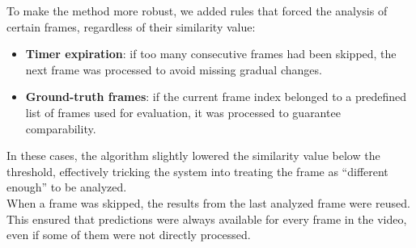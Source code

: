To make the method more robust, we added rules that forced the analysis of certain frames, regardless of their similarity value:
\begin{itemize}
\item \textbf{Timer expiration}: if too many consecutive frames had been skipped, the next frame was processed to avoid missing gradual changes.
\item \textbf{Ground-truth frames}: if the current frame index belonged to a predefined list of frames used for evaluation, it was processed to guarantee comparability.
\end{itemize}
In these cases, the algorithm slightly lowered the similarity value below the threshold, effectively tricking the system into treating the frame as “different enough” to be analyzed.\\
When a frame was skipped, the results from the last analyzed frame were reused. This ensured that predictions were always available for every frame in the video, even if some of them were not directly processed.


